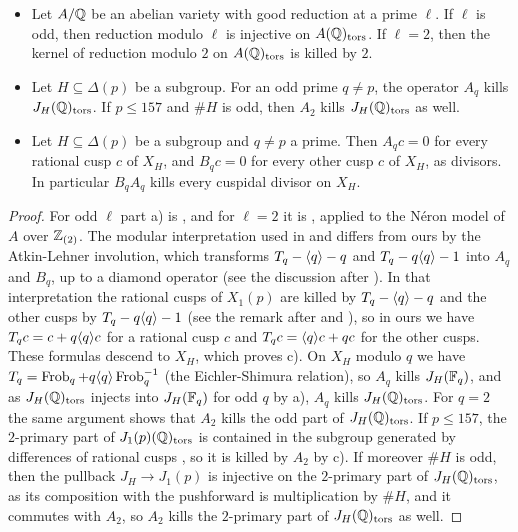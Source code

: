 \begin{lemma}\label{lem:torsion}
\begin{itemize}
\item[a)] Let $A/\mathbb{Q}$ be an abelian variety with good reduction at a prime $\ell$. If $\ell$ is odd, then reduction modulo $\ell$ is injective on $A(\mathbb{Q})_{\mathrm{tors}}$. If $\ell=2$, then the kernel of reduction modulo $2$ on $A(\mathbb{Q})_{\mathrm{tors}}$ is killed by $2$.
\item[b)] Let $H\subseteq\Delta(p)$ be a subgroup. For an odd prime $q\neq p$, the operator $A_q$ kills $J_H(\mathbb{Q})_{\mathrm{tors}}$. If $p\leq 157$ and $\#H$ is odd, then $A_2$ kills $J_H(\mathbb{Q})_{\mathrm{tors}}$ as well.
\item[c)] Let $H\subseteq\Delta(p)$ be a subgroup and $q\neq p$ a prime. Then $A_qc=0$ for every rational cusp $c$ of $X_H$, and $B_qc=0$ for every other cusp $c$ of $X_H$, as divisors. In particular $B_qA_q$ kills every cuspidal divisor on $X_H$.
\end{itemize}
\end{lemma}

\begin{proof}
For odd $\ell$ part a) is \cite[Appendix]{katz}, and for $\ell=2$ it is \cite[Lemme 1.7]{parent}, applied to the N\'eron model of $A$ over $\mathbb{Z}_{(2)}$. The modular interpretation used in \cite{DKSS} and \cite{DSt} differs from ours by the Atkin-Lehner involution, which transforms $T_q-\langle q\rangle-q$ and $T_q-q\langle q\rangle-1$ into $A_q$ and $B_q$, up to a diamond operator (see the discussion after \cite[Lemma 8.6]{DKSS}). In that interpretation the rational cusps of $X_1(p)$ are killed by $T_q-\langle q\rangle-q$ and the other cusps by $T_q-q\langle q\rangle-1$ (see the remark after \cite[Proposition 2.4]{DKSS} and \cite[Sections 1.5 and 2.4]{parent}), so in ours we have $T_qc=c+q\langle q\rangle c$ for a rational cusp $c$ and $T_qc=\langle q\rangle c+qc$ for the other cusps. These formulas descend to $X_H$, which proves c). On $X_H$ modulo $q$ we have $T_q=\operatorname{Frob}_q+q\langle q\rangle\operatorname{Frob}_q^{-1}$ (the Eichler-Shimura relation), so $A_q$ kills $J_H(\mathbb{F}_q)$, and as $J_H(\mathbb{Q})_{\mathrm{tors}}$ injects into $J_H(\mathbb{F}_q)$ for odd $q$ by a), $A_q$ kills $J_H(\mathbb{Q})_{\mathrm{tors}}$. For $q=2$ the same argument shows that $A_2$ kills the odd part of $J_H(\mathbb{Q})_{\mathrm{tors}}$. If $p\leq157$, the $2$-primary part of $J_1(p)(\mathbb{Q})_{\mathrm{tors}}$ is contained in the subgroup generated by differences of rational cusps \cite[Remark 4.4]{DSt}, so it is killed by $A_2$ by c). If moreover $\#H$ is odd, then the pullback $J_H\to J_1(p)$ is injective on the $2$-primary part of $J_H(\mathbb{Q})_{\mathrm{tors}}$, as its composition with the pushforward is multiplication by $\#H$, and it commutes with $A_2$, so $A_2$ kills the $2$-primary part of $J_H(\mathbb{Q})_{\mathrm{tors}}$ as well.
\end{proof}


